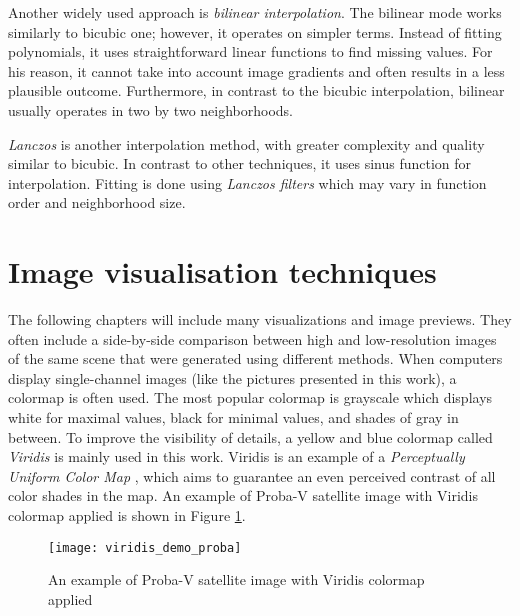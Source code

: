 Another widely used approach is \textit{bilinear interpolation}.
The bilinear mode works similarly to bicubic one; however, it operates on simpler terms.
Instead of fitting polynomials, it uses straightforward linear functions to find missing values.
For his reason, it cannot take into account image gradients and often results in a less plausible outcome.
Furthermore, in contrast to the bicubic interpolation, bilinear usually operates in two by two neighborhoods.

\textit{Lanczos} is another interpolation method, with greater complexity and quality similar to bicubic.
In contrast to other techniques, it uses sinus function for interpolation.
Fitting is done using \textit{Lanczos filters} which may vary in function order and neighborhood size.

\section{Image visualisation techniques}
The following chapters will include many visualizations and image previews.
They often include a side-by-side comparison between high and low-resolution images of the same scene that were generated using different methods.
When computers display single-channel images (like the pictures presented in this work), a colormap is often used.
The most popular colormap is grayscale which displays white for maximal values, black for minimal values, and shades of gray in between.
To improve the visibility of details, a yellow and blue colormap called \textit{Viridis} \cite{rudis-viridis} is mainly used in this work.
Viridis is an example of a \textit{Perceptually Uniform Color Map} \cite{kovesi-2015-colormaps}, which aims to guarantee an even perceived contrast of all color shades in the map.
An example of Proba-V satellite image with Viridis colormap applied is shown in Figure \ref{fig:viridis}.
\begin{figure}[htb]
	\centering
    \texttt{[image: viridis\_demo\_proba]}
    \caption{An example of Proba-V satellite image with Viridis colormap applied}
    \label{fig:viridis}
\end{figure}

